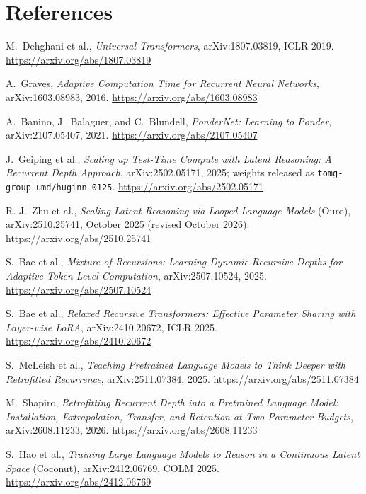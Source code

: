\documentclass[11pt,letterpaper]{article}
\begin{document}
\section{References}
\label{sec:refs}

\begingroup
\small
\sloppy
{}
\begin{enumerate}[label={\textcolor{deepindigo}{[\arabic*]}}, leftmargin=2.6em, itemsep=0.3em]
  \item M.~Dehghani et al., \emph{Universal Transformers}, arXiv:1807.03819, ICLR 2019. \url{https://arxiv.org/abs/1807.03819}
  \item A.~Graves, \emph{Adaptive Computation Time for Recurrent Neural Networks}, arXiv:1603.08983, 2016. \url{https://arxiv.org/abs/1603.08983}
  \item A.~Banino, J.~Balaguer, and C.~Blundell, \emph{PonderNet: Learning to Ponder}, arXiv:2107.05407, 2021. \url{https://arxiv.org/abs/2107.05407}
  \item J.~Geiping et al., \emph{Scaling up Test-Time Compute with Latent Reasoning: A Recurrent Depth Approach}, arXiv:2502.05171, 2025; weights released as \texttt{tomg-group-umd/huginn-0125}. \url{https://arxiv.org/abs/2502.05171}
  \item R.-J.~Zhu et al., \emph{Scaling Latent Reasoning via Looped Language Models} (Ouro), arXiv:2510.25741, October 2025 (revised October 2026). \url{https://arxiv.org/abs/2510.25741}
  \item S.~Bae et al., \emph{Mixture-of-Recursions: Learning Dynamic Recursive Depths for Adaptive Token-Level Computation}, arXiv:2507.10524, 2025. \url{https://arxiv.org/abs/2507.10524}
  \item S.~Bae et al., \emph{Relaxed Recursive Transformers: Effective Parameter Sharing with Layer-wise LoRA}, arXiv:2410.20672, ICLR 2025. \url{https://arxiv.org/abs/2410.20672}
  \item S.~McLeish et al., \emph{Teaching Pretrained Language Models to Think Deeper with Retrofitted Recurrence}, arXiv:2511.07384, 2025. \url{https://arxiv.org/abs/2511.07384}
  \item M.~Shapiro, \emph{Retrofitting Recurrent Depth into a Pretrained Language Model: Installation, Extrapolation, Transfer, and Retention at Two Parameter Budgets}, arXiv:2608.11233, 2026. \url{https://arxiv.org/abs/2608.11233}
  \item S.~Hao et al., \emph{Training Large Language Models to Reason in a Continuous Latent Space} (Coconut), arXiv:2412.06769, COLM 2025. \url{https://arxiv.org/abs/2412.06769}

\end{enumerate}
\end{document}
